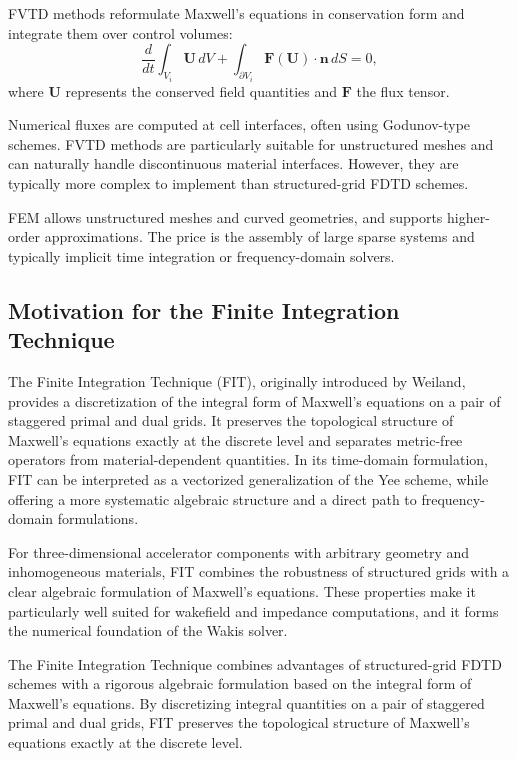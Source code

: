 FVTD methods reformulate Maxwell’s equations in conservation form and integrate them over control volumes:
\begin{equation}
\frac{d}{dt} \int_{V_i} \mathbf{U} \, dV
+ \int_{\partial V_i} \mathbf{F}(\mathbf{U}) \cdot \mathbf{n} \, dS = 0,
\end{equation}
where $\mathbf{U}$ represents the conserved field quantities and $\mathbf{F}$ the flux tensor.

Numerical fluxes are computed at cell interfaces, often using Godunov-type schemes. FVTD methods are particularly suitable for unstructured meshes and can naturally handle discontinuous material interfaces. However, they are typically more complex to implement than structured-grid FDTD schemes.

FEM allows unstructured meshes and curved geometries, and supports higher-order approximations. The price is the assembly of large sparse systems and typically implicit time integration or frequency-domain solvers.

\subsection*{Motivation for the Finite Integration Technique}

The Finite Integration Technique (FIT), originally introduced by Weiland, provides a discretization of the integral form of Maxwell’s equations on a pair of staggered primal and dual grids. It preserves the topological structure of Maxwell’s equations exactly at the discrete level and separates metric-free operators from material-dependent quantities. In its time-domain formulation, FIT can be interpreted as a vectorized generalization of the Yee scheme, while offering a more systematic algebraic structure and a direct path to frequency-domain formulations.

For three-dimensional accelerator components with arbitrary geometry and inhomogeneous materials, FIT combines the robustness of structured grids with a clear algebraic formulation of Maxwell’s equations. These properties make it particularly well suited for wakefield and impedance computations, and it forms the numerical foundation of the Wakis solver.

The Finite Integration Technique combines advantages of structured-grid FDTD schemes with a rigorous algebraic formulation based on the integral form of Maxwell’s equations. By discretizing integral quantities on a pair of staggered primal and dual grids, FIT preserves the topological structure of Maxwell’s equations exactly at the discrete level.


